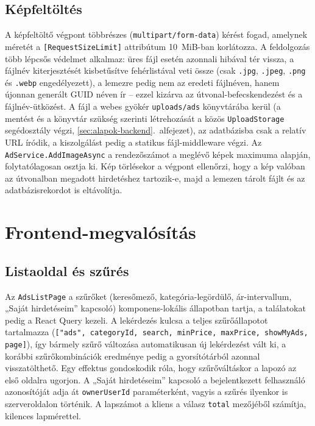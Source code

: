 \subsection{Képfeltöltés}

A képfeltöltő végpont többrészes (\texttt{multipart/form-data}) kérést fogad, amelynek méretét a
\texttt{[RequestSizeLimit]} attribútum 10~MiB-ban korlátozza. A feldolgozás több lépcsős
védelmet alkalmaz: üres fájl esetén azonnali hibával tér vissza, a fájlnév kiterjesztését
kisbetűsítve fehérlistával veti össze (csak \texttt{.jpg}, \texttt{.jpeg}, \texttt{.png} és
\texttt{.webp} engedélyezett), a lemezre pedig nem az eredeti fájlnéven, hanem újonnan generált
GUID néven ír -- ezzel kizárva az útvonal-befecskendezést és a fájlnév-ütközést. A fájl a webes
gyökér \texttt{uploads/ads} könyvtárába kerül (a mentést és a könyvtár szükség szerinti
létrehozását a közös \texttt{UploadStorage} segédosztály végzi,
\ref{sec:alapok-backend}.~alfejezet), az adatbázisba csak a relatív URL íródik, a kiszolgálást
pedig a statikus fájl-middleware végzi. Az \texttt{AdService.AddImageAsync} a rendezőszámot a meglévő képek
maximuma alapján, folytatólagosan osztja ki. Kép törlésekor a végpont ellenőrzi, hogy a kép
valóban az útvonalban megadott hirdetéshez tartozik-e, majd a lemezen tárolt fájlt és az
adatbázisrekordot is eltávolítja.

\section{Frontend-megvalósítás}
\label{sec:ads-frontend}

\subsection{Listaoldal és szűrés}

Az \texttt{AdsListPage} a szűrőket (keresőmező, kategória-legördülő, ár-intervallum, „Saját
hirdetéseim” kapcsoló) komponens-lokális állapotban tartja, a találatokat pedig a React Query
kezeli. A lekérdezés kulcsa a teljes szűrőállapotot tartalmazza
(\texttt{["ads", categoryId, search, minPrice, maxPrice, showMyAds, page]}), így bármely szűrő
változása automatikusan új lekérdezést vált ki, a korábbi szűrőkombinációk eredménye pedig a
gyorsítótárból azonnal visszatölthető. Egy effektus gondoskodik róla, hogy szűrőváltáskor a lapozó
az első oldalra ugorjon. A „Saját hirdetéseim” kapcsoló a bejelentkezett felhasználó azonosítóját
adja át \texttt{ownerUserId} paraméterként, vagyis a szűrés ilyenkor is szerveroldalon történik. A
lapszámot a kliens a válasz \texttt{total} mezőjéből számítja, kilences lapmérettel.

